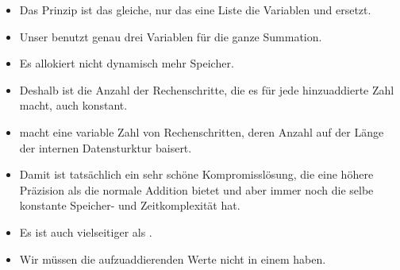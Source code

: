 \documentclass[aspectratio=169,mathserif,notheorems]{beamer}%
\begin{document}
\begin{frame}[t]
\begin{itemize}
{}%
%
%
%
%
%
\item<17-> Das Prinzip ist das gleiche, nur das eine Liste die Variablen  und  ersetzt.%
%
\item<18-> Unser  benutzt genau drei Variablen für die ganze Summation.%
%
\item<19-> Es allokiert nicht dynamisch mehr Speicher.%
%
\item<20-> Deshalb ist die Anzahl der Rechenschritte, die es für jede hinzuaddierte Zahl macht, auch konstant.%
%
\item<21->  macht eine variable Zahl von Rechenschritten, deren Anzahl auf der Länge der internen Datensturktur baisert.%
%
\item<22-> Damit ist  tatsächlich ein sehr schöne Kompromisslösung, die eine höhere Präzision als die normale Addition bietet und aber immer noch die selbe konstante Speicher- und Zeitkomplexität hat.%
%
\item<23-> Es ist auch vielseitiger als .%
%
\item<24-> Wir müssen die aufzuaddierenden Werte nicht in einem  haben.%
%
\end{itemize}%
\end{frame}%
%
%
\end{document}
